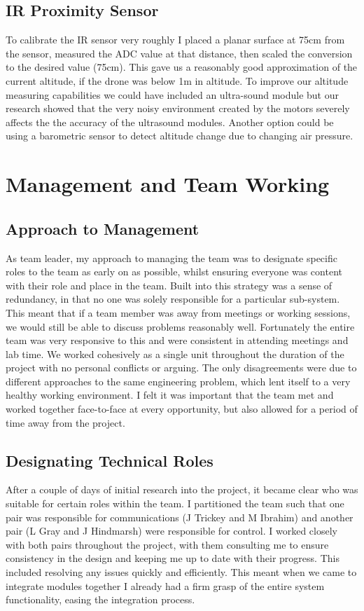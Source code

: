 \documentclass[a4paper,11pt]{article}
\begin{document}
\subsection{IR Proximity Sensor}
To calibrate the IR sensor very roughly I placed a planar surface at 75cm from the sensor, measured the ADC value at that distance, then scaled the conversion to the desired value (75cm). This gave us a reasonably good approximation of the current altitude, if the drone was below 1m in altitude. To improve our altitude measuring capabilities we could have included an ultra-sound module but our research showed that the very noisy environment created by the motors severely affects the the accuracy of the ultrasound modules. Another option could be using a barometric sensor to detect altitude change due to changing air pressure. 


\section{Management and Team Working}
\subsection{Approach to Management}
As team leader, my approach to managing the team was to designate specific roles to the team as early on as possible, whilst ensuring everyone was content with their role and place in the team. Built into this strategy was a sense of redundancy, in that no one was solely responsible for a particular sub-system. This meant that if a team member was away from meetings or working sessions, we would still be able to discuss problems reasonably well. Fortunately the entire team was very responsive to this and were consistent in attending meetings and lab time. We worked cohesively as a single unit throughout the duration of the project with no personal conflicts or arguing. The only disagreements were due to different approaches to the same engineering problem, which lent itself to a very healthy working environment. I felt it was important that the team met and worked together face-to-face at every opportunity, but also allowed for a period of time away from the project. 
\subsection{Designating Technical Roles}
After a couple of days of initial research into the project, it became clear who was suitable for certain roles within the team. I partitioned the team such that one pair was responsible for communications (J Trickey and M Ibrahim) and another pair (L Gray and J Hindmarsh) were responsible for control. I worked closely with both pairs throughout the project, with them consulting me to ensure consistency in the design and keeping me up to date with their progress. This included resolving any issues quickly and efficiently. This meant when we came to integrate modules together I already had a firm grasp of the entire system functionality, easing the integration process.
\end{document}
